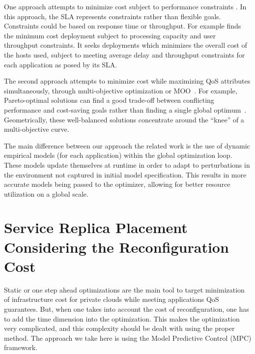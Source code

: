 One approach attempts to minimize cost subject to performance constraints
\cite{li_fast_2009,li_performance_2009}. In this approach, the SLA represents
constraints rather than flexible goals. Constraints could be based on response
time or throughput. For example \cite{li_fast_2009} finds the minimum cost
deployment subject to processing capacity and user throughput constraints. It
seeks deployments which minimizes the overall cost of the hosts used, subject to meeting average delay and
throughput constraints for each application as posed by its SLA. 

The second approach attempts to minimize cost while maximizing QoS
attributes simultaneously, through multi-objective optimization or
MOO~\cite{li_sla-driven_2010}. For example, Pareto-optimal solutions can find a
good trade-off between conflicting performance and cost-saving goals rather than
 finding a single global optimum~\cite{soror_automatic_2010}. Geometrically,
 these well-balanced solutions concentrate around the ``knee'' of a
 multi-objective curve.

The main difference between our approach the related work is the use of dynamic empirical models (for each application) within the
global optimization loop. These models update themselves at runtime in order to adapt to perturbations in the environment not captured in initial model specification.  This results in more accurate models being passed to the optimizer, allowing for better resource utilization on a global scale.  

    
\section{Service Replica Placement Considering the Reconfiguration Cost} 
\label{sec:service_replica_placement_considering_trhing_cost} 
 Static or one step ahead optimizations are the main tool to target minimization of infrastructure cost for private clouds while meeting applications QoS guarantees. But, when one takes into account the cost of reconfiguration, one has to add the time dimension into the optimization. This makes the optimization very complicated, and this complexity should be dealt with using the proper method. The approach we take here is using the Model Predictive Control (MPC) framework.  


